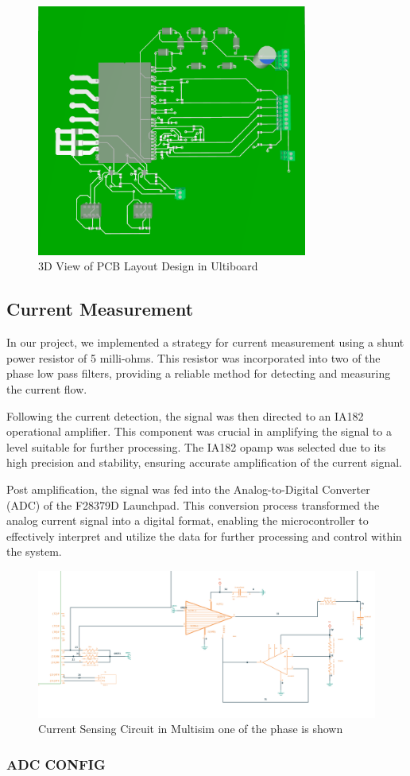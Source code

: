\begin{figure}[H]
	\centering
	\includegraphics[width=3.5in]{sections/section4/images/PCBDesign/Ultiboard/3DTopView.png}
	\caption{3D View of PCB Layout Design in Ultiboard}
\end{figure}


\subsection{Current Measurement}

In our project, we implemented a strategy for current measurement using a shunt power resistor of 5 milli-ohms. This resistor was incorporated into two of the phase low pass filters, providing a reliable method for detecting and measuring the current flow.

Following the current detection, the signal was then directed to an IA182 operational amplifier. This component was crucial in amplifying the signal to a level suitable for further processing. The IA182 opamp was selected due to its high precision and stability, ensuring accurate amplification of the current signal.

Post amplification, the signal was fed into the Analog-to-Digital Converter (ADC) of the F28379D Launchpad. This conversion process transformed the analog current signal into a digital format, enabling the microcontroller to effectively interpret and utilize the data for further processing and control within the system. 



\begin{figure}[H]
	\centering
	\includegraphics[width=6in]{sections/section4/images/PCBDesign/Multisim/MultisimCurrentSensing.png}
	\caption{Current Sensing Circuit in Multisim one of the phase is shown}
\end{figure}


\subsubsection{ADC CONFIG}


\newpage